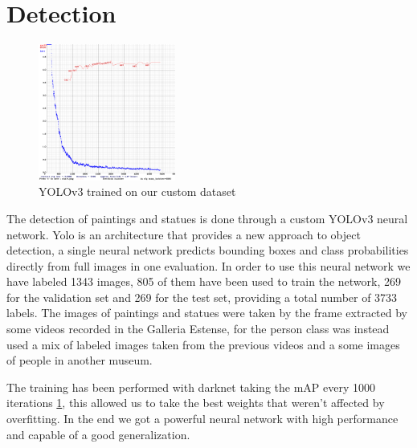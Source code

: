 \section{Detection}

\begin{figure}[h!]
    \centering
        \includegraphics[width=0.4\textwidth]{pictures/painting_detection/training-v3.png}
    \caption{YOLOv3 trained on our custom dataset}
    \label{fig:training-v3}
\end{figure}



The detection of paintings and statues is done through a custom YOLOv3 neural network.\cite{yolov3}
Yolo is an architecture that provides a new approach to object detection, a single neural network predicts bounding boxes and class probabilities directly from full images in one evaluation.
In order to use this neural network we have labeled 1343 images, 805 of them have been used to train the network, 269 for the validation set and 269 for the test set, providing a total number of 3733 labels. The images of paintings and statues were taken by the frame extracted by some videos recorded in the Galleria Estense, for the person class was instead used a mix of labeled images taken from the previous videos and a some images of people in another museum.


The training has been performed with darknet \cite{darknet} taking the mAP every 1000 iterations \ref{fig:training-v3}, this allowed us to take the best weights that weren't affected by overfitting.
In the end we got a powerful neural network with high performance and capable of a good generalization.

